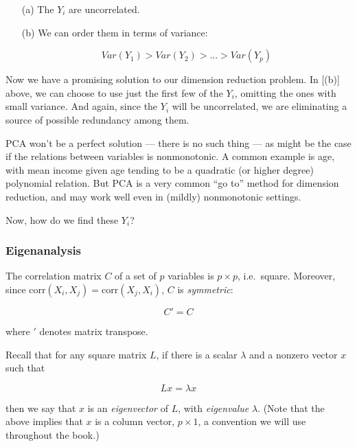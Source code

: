 \begin{itemize}

\item [(a)] The $Y_i$ are uncorrelated.

\item [(b)] We can order them in terms of variance:

\begin{equation}
Var(Y_1) > Var(Y_2) > ... > Var(Y_p)
\end{equation}

\end{itemize} 

Now we have a promising solution to our dimension reduction problem.
In [(b)] above, we can choose to use just the first few of the $Y_i$,
omitting the ones with small variance.  And again, since the $Y_i$ will
be uncorrelated, we are eliminating a source of possible redundancy
among them.

PCA won't be a perfect solution --- there is no such thing --- as might
be the case if the relations between variables is nonmonotonic.  A
common example is age, with mean income given age tending to be a
quadratic (or higher degree) polynomial relation.  But PCA is a very
common ``go to'' method for dimension reduction, and may work well even
in (mildly) nonmonotonic settings.

Now, how do we find these $Y_i$?

\subsubsection{Eigenanalysis}

The correlation matrix $C$ of a set of $p$ variables is $p \times p$, i.e.\
square.  Moreover, since $\textrm{corr}(X_i,X_j) = \textrm{corr}(X_j,X_i)$,
$C$ is \textit{symmetric}:

\begin{equation}
C' = C
\end{equation}

where $'$ denotes matrix transpose.  

Recall that for any square matrix $L$, if there is a scalar $\lambda$
and a nonzero vector $x$ such that 

\begin{equation}
Lx = \lambda x
\end{equation}

then we say that $x$ is an \textit{eigenvector} of $L$, with
\textit{eigenvalue} $\lambda$.  (Note that the above implies that $x$ is
a column vector, $p \times 1$, a convention we will use throughout the
book.)

